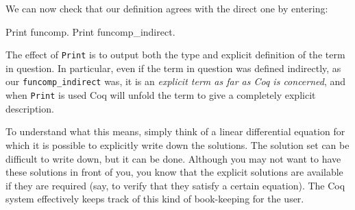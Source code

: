 We can now check that our definition agrees with the direct
one by entering:
\begin{center}
  \begin{coqcode}
Print funcomp.
Print funcomp_indirect.
  \end{coqcode}
\end{center}
The effect of \verb|Print| is to output both the type and
explicit definition of the term in question.  In particular, even if
the term in question was defined indirectly, as our
\verb|funcomp_indirect| was, it is an \emph{explicit term
as far as Coq is concerned}, and when \verb|Print| is used Coq
will unfold the term to give a completely explicit description.

To understand what this means, simply think of a linear differential
equation for which it is possible to explicitly write down
the solutions. The solution set can be difficult to write down, but it can
be done. Although you may not want to have these solutions in front of
you, you know that the explicit solutions are available if they are required (say, to
verify that they satisfy a certain equation).  The Coq system
effectively keeps track of this kind of book-keeping for the user.

